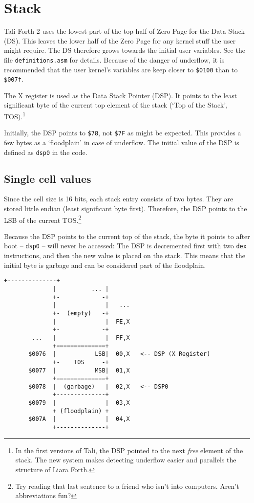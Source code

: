
\section{Stack}

Tali Forth 2 uses the lowest part of the top half of Zero Page for the Data
Stack (DS). This leaves the lower half of the Zero Page for any kernel stuff the
user might require. The DS therefore grows towards the initial user variables.
See the file \texttt{definitions.asm} for details.  Because of the danger of
underflow, it is recommended that the user kernel's variables are keep closer to
\texttt{\$0100} than to \texttt{\$007f}.

The X register is used as the Data Stack Pointer (DSP). It points to the least
significant byte of the current top element of the stack (`Top of the Stack',
TOS).\footnote{In the first versions of Tali, the DSP pointed to the next
\textit{free} element of the stack. The new system makes detecting underflow
easier and parallels the structure of Liara Forth.}

Initially, the DSP points to \texttt{\$78}, not \texttt{\$7F} as might be
expected. This provides a few bytes as a `floodplain' in case of underflow. The
initial value of the DSP is defined as \texttt{dsp0} in the code.

\subsection{Single cell values} Since the cell size is 16 bits, each stack entry
consists of two bytes. They are stored little endian (least significant byte
first). Therefore, the DSP points to the LSB of the current TOS.\footnote{Try
reading that last sentence to a friend who isn't into computers. Aren't
abbreviations fun?}

Because the DSP points to the current top of the stack, the byte it points to
after boot -- \texttt{dsp0} -- will never be accessed: The DSP is decremented first with
two \texttt{dex} instructions, and then the new value is placed on the stack. This
means that the initial byte is garbage and can be considered part of the floodplain. 

\begin{lstlisting}[frame=single]
              +--------------+           
              |          ... |  
              +-            -+ 
              |              |   ...
              +-  (empty)   -+
              |              |  FE,X
              +-            -+ 
        ...   |              |  FF,X
              +==============+  
       $0076  |           LSB|  00,X   <-- DSP (X Register)
              +-    TOS     -+ 
       $0077  |           MSB|  01,X
              +==============+ 
       $0078  |  (garbage)   |  02,X   <-- DSP0 
              +--------------+           
       $0079  |              |  03,X
              + (floodplain) + 
       $007A  |              |  04,X
              +--------------+           
\end{lstlisting}

